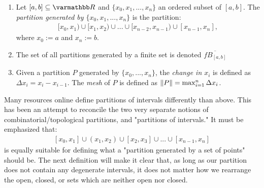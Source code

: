     \begin{definition}
        \phantom{a}
        \begin{enumerate}[label = (\arabic*),itemsep=1pt,topsep=3pt]
            \item Let $[a,b] \subseteq \bfR$ and $\{x_0,x_1,...,x_n\}$ an ordered subset of $[a,b]$. The \textit{partition generated by $\{x_0,x_1,...,x_n\}$} is the partition:
            \begin{equation*}
            \begin{split}
                [x_0,x_1) \cup [x_1,x_2) \cup ... \cup [x_{n-2},x_{n-1}) \cup [x_{n-1},x_n],
            \end{split}
            \end{equation*}
            where $x_0 := a$ and $x_n := b$.

            \item The set of all partitions generated by a finite set is denoted $\overline{fB_{[a,b]}}$

            \item Given a partition $P$ generated by $\{x_0,...,x_n\}$, the \textit{change in $x_i$} is defined as $\Delta x_i = x_i - x_{i-1}$. The \textit{mesh} of $P$ is defined as $\left\lVert P \right\rVert = \max_{i = 1}^n \Delta x_i$.
        \end{enumerate}
    \end{definition}

    Many resources online define partitions of intervals differently than above. This has been an attempt to reconcile the two very separate notions of combinatorial/topological partitions, and "partitions of intervals." It must be emphasized that:
        \begin{equation*}
        \begin{split}
            [x_0,x_1] \cup (x_1,x_2) \cup [x_2,x_3] \cup ... \cup [x_{n-1},x_n]
        \end{split}
        \end{equation*}
    is equally suitable for defining what a "partition generated by a set of points" should be. The next definition will make it clear that, as long as our partition does not contain any degenerate intervals, it does not matter how we rearrange the open, closed, or sets which are neither open nor closed.

